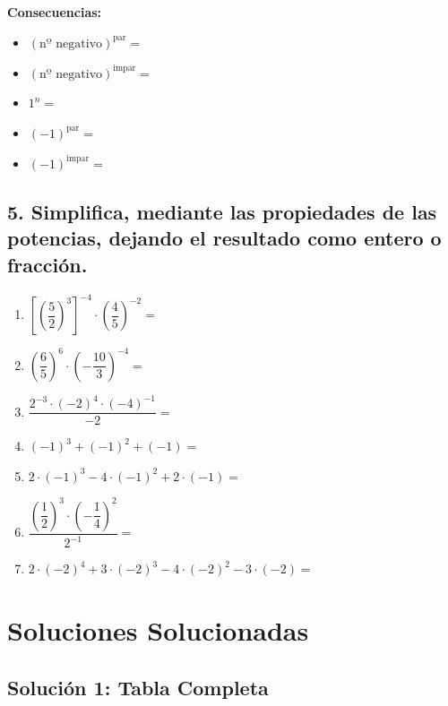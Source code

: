 \documentclass[a4paper,12pt]{article}
\begin{document}
\textbf{Consecuencias:}
\begin{itemize}
    \item $(\text{nº negativo})^{\text{par}} =$
    \item $(\text{nº negativo})^{\text{impar}} =$
    \item $1^{n} =$
    \item $(-1)^{\text{par}} =$
    \item $(-1)^{\text{impar}} =$
\end{itemize}

\vspace{0.5cm}

\subsection*{5. Simplifica, mediante las propiedades de las potencias, dejando el resultado como entero o fracción.}

\begin{enumerate}[label=\alph*)]
    \item $\left[\left(\dfrac{5}{2}\right)^{3}\right]^{-4} \cdot \left(\dfrac{4}{5}\right)^{-2} =$
    \item $\left(\dfrac{6}{5}\right)^{6} \cdot \left(-\dfrac{10}{3}\right)^{-4} =$
    \item $\dfrac{2^{-3} \cdot (-2)^{4} \cdot (-4)^{-1}}{-2} =$
    \item $(-1)^{3} + (-1)^{2} + (-1) =$
    \item $2 \cdot (-1)^{3} - 4 \cdot (-1)^{2} + 2 \cdot (-1) =$
    \item $\dfrac{\left(\dfrac{1}{2}\right)^{3} \cdot \left(-\dfrac{1}{4}\right)^{2}}{2^{-1}} =$
    \item $2 \cdot (-2)^{4} + 3 \cdot (-2)^{3} - 4 \cdot (-2)^{2} - 3 \cdot (-2) =$
\end{enumerate}

\newpage
\section*{Soluciones Solucionadas}

\subsection*{Solución 1: Tabla Completa}
\end{document}
